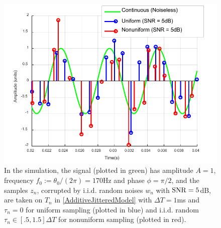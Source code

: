 \documentclass{UCF_ETD}
\begin{document}
\begin{figure}[H]
\begin{center}
\includegraphics[scale=1]{NonuniformANF/SignalUnifNonUnif}
\caption{In the simulation, the signal (plotted in green) has
amplitude $A=1$,  frequency $f_0:=\theta_0/(2\pi)=170$Hz and phase
$\phi=\pi/2$,  and the samples $z_n$, corrupted by
i.i.d. random   noises $w_n$ with ${\rm SNR}= 5$dB, are taken on $T_n$ in \eqref{AdditiveJitteredModel} with $\Delta T = 1$ms and
$\tau_n=0$ for uniform sampling (plotted in blue) and i.i.d. random $\tau_n\in [.5, 1.5]\Delta T $ for nonuniform sampling (plotted in red). }
\label{NonUniformSampling.fig}
\end{center}
\end{figure}
\end{document}
